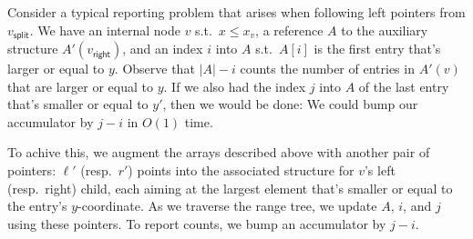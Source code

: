 \documentclass[a4paper]{article}
\begin{document}
\begin{enumerate}[a)]
\begin{itemize}
\end{itemize}
Consider a typical reporting problem that arises when following left pointers from $v_\textsf{split}$.
We have an internal node $v$ s.t.\ $x \le x_v$, a reference $A$ to the auxiliary structure $A'(v_\textsf{right})$, and an index $i$ into $A$ s.t.\ $A[i]$ is the first entry that's larger or equal to $y$.
Observe that $|A| - i$ counts the number of entries in $A'(v)$ that are larger or equal to $y$.
If we also had the index $j$ into $A$ of the last entry that's smaller or equal to $y'$, then we would be done:
We could bump our accumulator by $j-i$ in $O(1)$ time.

To achive this, we augment the arrays described above with another pair of pointers:
$\ell'$ (resp.\ $r'$) points into the associated structure for $v$'s left (resp.\ right) child, each aiming at the largest element that's smaller or equal to the entry's $y$-coordinate.
As we traverse the range tree, we update $A$, $i$, and $j$ using these pointers.
To report counts, we bump an accumulator by $j-i$.

\end{enumerate}
\end{document}
